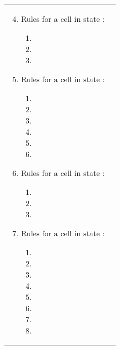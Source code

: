 \documentclass[preliminary,copyright,creativecommons]{eptcs}
\theoremstyle{remark}
\begin{document}
\begin{tabular}[t]{ll}
  \begin{minipage}[t]{3.0in}
  \begin{enumerate}

  \setcounter{enumi}{3}
  \item Rules for a cell  in state :
    \begin{enumerate}[1]
    \item 

    \item 

    \item 
    \end{enumerate}

\item Rules for a cell  in state :
    \begin{enumerate}[1]
    \item 

    \item  
    \item  

    \item 
    \item  

    \item 
    \end{enumerate}

  \item Rules for a cell  in state :
    \begin{enumerate}[1]
\item  

    \item 

    \item 
    \end{enumerate}

  \item Rules for a cell  in state :
    \begin{enumerate}[1]

    \item 
    \item 

    \item 
    \item 

    \item 
    \item 

    \item 
    \item 
    \end{enumerate}


\end{enumerate}
\end{minipage}
\end{tabular}
\end{document}
